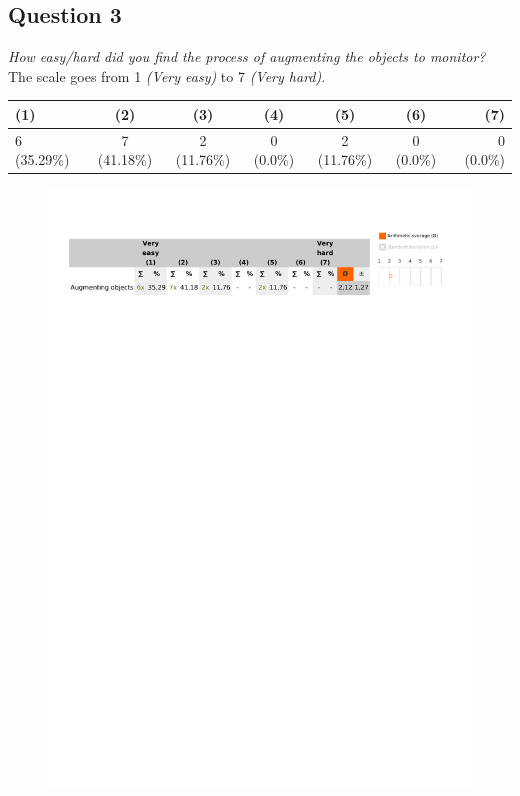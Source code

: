 \subsection{Question 3}
\emph{How easy/hard did you find the process of augmenting the objects to monitor?}\\

The scale goes from 1 \emph{(Very easy)} to 7 \emph{(Very hard)}.
\begin{table}[H]
	\begin{center}
		\small \begin{tabular*}{1.15\columnwidth}{lcccccr}
			\\ \hline \hline
			(1) & (2) & (3) & (4) & (5) & (6) & (7) \\ \hline \hline

		 	6 (35.29\%) & 7 (41.18\%) & 2 (11.76\%) & 0 (0.0\%) & 2 (11.76\%) & 0 (0.0\%) & 0 (0.0\%)\\ \hline
		\end{tabular*}
	\end{center}
\end{table}

\begin{figure}[H]
	\centering
	\includegraphics[width=0.6\linewidth]{gfx/Chapter_EvaluationResults/ChildproofTask/question3}
\end{figure}

